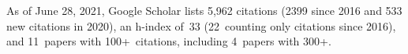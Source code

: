 %
As of June 28, 2021, Google Scholar lists
5,962 citations (2399 since 2016 and 533 new citations in 2020),
an h-index of~33 (22~counting only citations since 2016),
and 11~papers with 100+~citations, including 4~papers with 300+.
